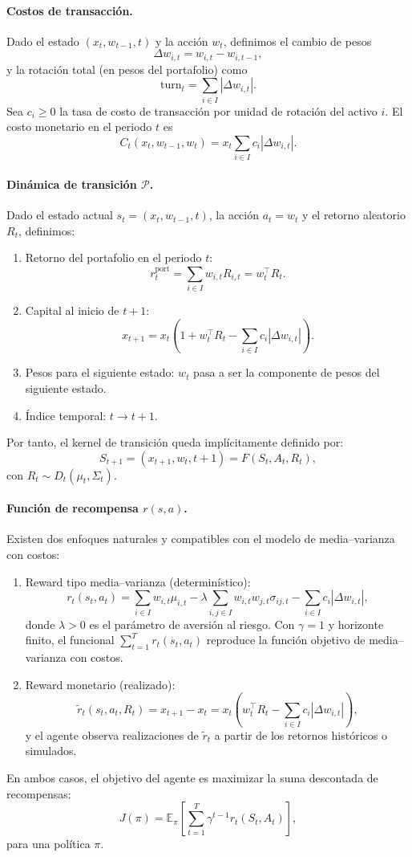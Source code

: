 \documentclass[12pt]{article}
\begin{document}
\paragraph{Costos de transacción.} Dado el estado $(x_t, w_{t-1}, t)$ y la acción $w_t$, definimos el cambio de pesos
$$\Delta w_{i,t} = w_{i,t} - w_{i,t-1},$$
y la rotación total (en pesos del portafolio) como
$$\text{turn}_t = \sum_{i \in I} |\Delta w_{i,t}|.$$
Sea $c_i \geq 0$ la tasa de costo de transacción por unidad de rotación del activo $i$. El costo monetario en el periodo $t$ es
$$C_t(x_t, w_{t-1}, w_t) = x_t \sum_{i \in I} c_i |\Delta w_{i,t}|.$$

\paragraph{Dinámica de transición $\mathcal{P}$.} Dado el estado actual $s_t = (x_t, w_{t-1}, t)$, la acción $a_t = w_t$ y el retorno aleatorio $R_t$, definimos:
\begin{enumerate}
    \item Retorno del portafolio en el periodo $t$:
    $$r^{\text{port}}_t = \sum_{i \in I} w_{i,t} R_{i,t} = w_t^\top R_t.$$
    \item Capital al inicio de $t + 1$:
    $$x_{t+1} = x_t \left(1 + w_t^\top R_t - \sum_{i \in I} c_i |\Delta w_{i,t}|\right).$$
    \item Pesos para el siguiente estado: $w_t$ pasa a ser la componente de pesos del siguiente estado.
    \item Índice temporal: $t \to t + 1$.
\end{enumerate}
Por tanto, el kernel de transición queda implícitamente definido por:
$$S_{t+1} = (x_{t+1}, w_t, t + 1) = F(S_t, A_t, R_t),$$
con $R_t \sim D_t(\mu_t, \Sigma_t)$.

\paragraph{Función de recompensa $r(s, a)$.} Existen dos enfoques naturales y compatibles con el modelo de media--varianza con costos:
\begin{enumerate}
    \item Reward tipo media--varianza (determinístico):
    $$r_t(s_t, a_t) = \sum_{i \in I} w_{i,t} \mu_{i,t} - \lambda \sum_{i,j \in I} w_{i,t} w_{j,t} \sigma_{ij,t} - \sum_{i \in I} c_i |\Delta w_{i,t}|,$$
    donde $\lambda > 0$ es el parámetro de aversión al riesgo. Con $\gamma = 1$ y horizonte finito, el funcional $\sum_{t=1}^T r_t(s_t, a_t)$ reproduce la función objetivo de media--varianza con costos.
    \item Reward monetario (realizado):
    $$\tilde{r}_t(s_t, a_t, R_t) = x_{t+1} - x_t = x_t \left( w_t^\top R_t - \sum_{i \in I} c_i |\Delta w_{i,t}| \right),$$
    y el agente observa realizaciones de $\tilde{r}_t$ a partir de los retornos históricos o simulados.
\end{enumerate}
En ambos casos, el objetivo del agente es maximizar la suma descontada de recompensas:
$$J(\pi) = \mathbb{E}_\pi \left[ \sum_{t=1}^T \gamma^{t-1} r_t(S_t, A_t) \right],$$
para una política $\pi$.
\end{document}
